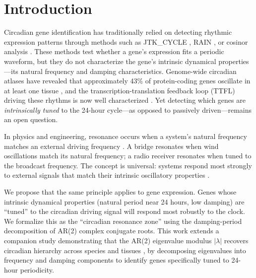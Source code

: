 \documentclass[11pt,letterpaper]{article}
\begin{document}
\begin{abstract}
\noindent\textbf{Conclusions:} Damping-period decomposition of AR(2) roots provides a principled method for blind circadian gene discovery. The 60-fold clock gene enrichment validates the approach. The 22 multi-tissue resonance genes represent the strongest novel predictions for experimental follow-up. The resonance zone concept connects gene expression analysis to resonance theory in physics and engineering, where identifying natural frequencies tuned to external driving forces is foundational.

\noindent\textbf{Keywords:} resonance zone, circadian rhythm, damping rate, natural period, AR(2), gene discovery, genome-wide screening, oscillatory dynamics
\end{abstract}

\section{Introduction}

Circadian gene identification has traditionally relied on detecting rhythmic expression patterns through methods such as JTK\_CYCLE \citep{hughes2010jtk}, RAIN \citep{thaben2014detecting}, or cosinor analysis \citep{cornelissen2014cosinor}. These methods test whether a gene's expression fits a periodic waveform, but they do not characterize the gene's intrinsic dynamical properties---its natural frequency and damping characteristics. Genome-wide circadian atlases have revealed that approximately 43\% of protein-coding genes oscillate in at least one tissue \citep{zhang2014circadian}, and the transcription-translation feedback loop (TTFL) driving these rhythms is now well characterized \citep{takahashi2017transcriptional, lowrey2011genetics, ko2006molecular}. Yet detecting which genes are \textit{intrinsically tuned} to the 24-hour cycle---as opposed to passively driven---remains an open question.

In physics and engineering, resonance occurs when a system's natural frequency matches an external driving frequency \citep{strogatz2001nonlinear}. A bridge resonates when wind oscillations match its natural frequency; a radio receiver resonates when tuned to the broadcast frequency. The concept is universal: systems respond most strongly to external signals that match their intrinsic oscillatory properties \citep{alon2006introduction}.

We propose that the same principle applies to gene expression. Genes whose intrinsic dynamical properties (natural period near 24 hours, low damping) are ``tuned'' to the circadian driving signal will respond most robustly to the clock. We formalize this as the ``circadian resonance zone'' using the damping-period decomposition of AR(2) complex conjugate roots. This work extends a companion study demonstrating that the AR(2) eigenvalue modulus $|\lambda|$ recovers circadian hierarchy across species and tissues \citep{whiteside2026par2}, by decomposing eigenvalues into frequency and damping components to identify genes specifically tuned to 24-hour periodicity.
\end{document}
